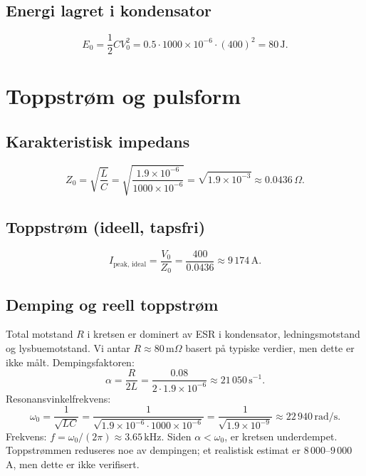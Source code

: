 \documentclass{article}
\begin{document}
\subsection{Energi lagret i kondensator}
\begin{equation}
E_0 = \frac{1}{2} C V_0^2 = 0.5 \cdot 1000 \times 10^{-6} \cdot (400)^2 = 80\,\text{J}.
\end{equation}

\section{Toppstrøm og pulsform}

\subsection{Karakteristisk impedans}
\begin{equation}
Z_0 = \sqrt{\frac{L}{C}} = \sqrt{\frac{1.9 \times 10^{-6}}{1000 \times 10^{-6}}} = \sqrt{1.9 \times 10^{-3}} \approx 0.0436\,\Omega.
\end{equation}

\subsection{Toppstrøm (ideell, tapsfri)}
\begin{equation}
I_{\text{peak, ideal}} = \frac{V_0}{Z_0} = \frac{400}{0.0436} \approx 9\,174\,\text{A}.
\end{equation}

\subsection{Demping og reell toppstrøm}
Total motstand $R$ i kretsen er dominert av ESR i kondensator, ledningsmotstand og lysbuemotstand. Vi antar $R \approx 80\,\text{m}\Omega$ basert på typiske verdier, men dette er ikke målt. Dempingsfaktoren:
\begin{equation}
\alpha = \frac{R}{2L} = \frac{0.08}{2 \cdot 1.9 \times 10^{-6}} \approx 21\,050\,\text{s}^{-1}.
\end{equation}
Resonansvinkelfrekvens:
\begin{equation}
\omega_0 = \frac{1}{\sqrt{LC}} = \frac{1}{\sqrt{1.9 \times 10^{-6} \cdot 1000 \times 10^{-6}}} = \frac{1}{\sqrt{1.9 \times 10^{-9}}} \approx 22\,940\,\text{rad/s}.
\end{equation}
Frekvens: $f = \omega_0/(2\pi) \approx 3.65\,\text{kHz}$.
Siden $\alpha < \omega_0$, er kretsen underdempet. Toppstrømmen reduseres noe av dempingen; et realistisk estimat er $8\,000$--$9\,000$ A, men dette er ikke verifisert.
\end{document}
